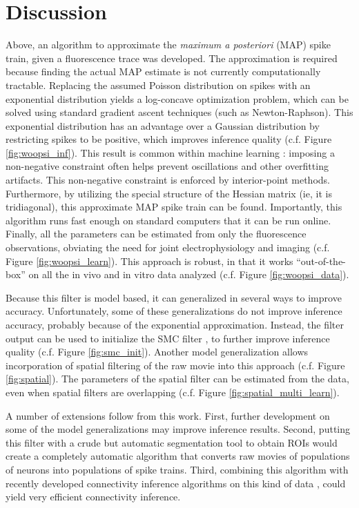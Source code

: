 \section{Discussion} \label{sec:dis}


Above, an algorithm to approximate the \emph{maximum a posteriori} (MAP) spike train, given a fluorescence trace was developed.  The approximation is required because finding the actual MAP estimate is not currently computationally tractable.  Replacing the assumed Poisson distribution on spikes with an exponential distribution yields a log-concave optimization problem, which can be solved using standard gradient ascent techniques (such as Newton-Raphson).  This exponential distribution has an advantage over a Gaussian distribution by restricting spikes to be positive, which improves inference quality (c.f. Figure \ref{fig:woopsi_inf}).  This result is common within machine learning \cite{Hoyer04,OGradyPearlmutter06}: imposing a non-negative constraint often helps prevent oscillations and other overfitting artifacts. This non-negative constraint is enforced by interior-point methods.  Furthermore, by utilizing the special structure of the Hessian matrix (ie, it is tridiagonal), this approximate MAP spike train can be found.  Importantly, this algorithm runs fast enough on standard computers that it can be run online.  Finally, all the parameters can be estimated from only the fluorescence observations, obviating the need for joint electrophysiology and imaging (c.f. Figure \ref{fig:woopsi_learn}).  This approach is robust, in that it works ``out-of-the-box'' on all the in vivo and in vitro data analyzed (c.f. Figure \ref{fig:woopsi_data}).

Because this filter is model based, it can generalized in several ways to improve accuracy.  Unfortunately, some of these generalizations do not improve inference accuracy, probably because of the exponential approximation.  Instead, the \foopsi filter output can be used to initialize the SMC filter \cite{VogelsteinPaninski09}, to further improve inference quality (c.f. Figure \ref{fig:smc_init}).  Another model generalization allows incorporation of spatial filtering of the raw movie into this approach (c.f. Figure \ref{fig:spatial}).  The parameters of the spatial filter can be estimated from the data, even when spatial filters are overlapping (c.f. Figure \ref{fig:spatial_multi_learn}).

A number of extensions follow from this work.  First, further development on some of the model generalizations may improve inference results. Second, putting this filter with a crude but automatic segmentation tool to obtain ROIs would create a completely automatic algorithm that converts raw movies of populations of neurons into populations of spike trains.  Third, combining this algorithm with recently developed connectivity inference algorithms on this kind of data \cite{MishchenkoPaninski09}, could yield very efficient connectivity inference.